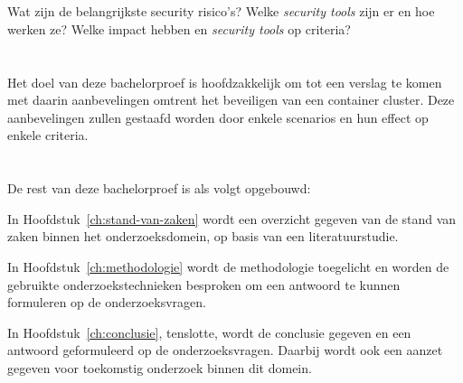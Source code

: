 \section{}
\label{sec:onderzoeksvraag}


Wat zijn de belangrijkste security risico's? Welke \textit{security tools} zijn er en hoe werken ze? Welke impact hebben  en \textit{security tools} op criteria?

\section{}
\label{sec:onderzoeksdoelstelling}


Het doel van deze bachelorproef is hoofdzakkelijk om tot een verslag te komen met daarin aanbevelingen omtrent het beveiligen van een container cluster. Deze aanbevelingen zullen gestaafd worden door enkele scenarios en hun effect op enkele criteria.

\section{}
\label{sec:opzet-bachelorproef}


De rest van deze bachelorproef is als volgt opgebouwd:

In Hoofdstuk~\ref{ch:stand-van-zaken} wordt een overzicht gegeven van de stand van zaken binnen het onderzoeksdomein, op basis van een literatuurstudie.

In Hoofdstuk~\ref{ch:methodologie} wordt de methodologie toegelicht en worden de gebruikte onderzoekstechnieken besproken om een antwoord te kunnen formuleren op de onderzoeksvragen.


In Hoofdstuk~\ref{ch:conclusie}, tenslotte, wordt de conclusie gegeven en een antwoord geformuleerd op de onderzoeksvragen. Daarbij wordt ook een aanzet gegeven voor toekomstig onderzoek binnen dit domein.